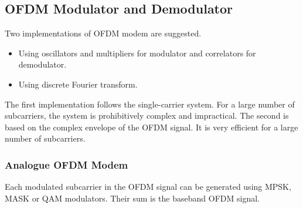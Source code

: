 \subsection{\gls{OFDM} Modulator and Demodulator}
Two implementations of \gls{OFDM} modem are suggested.
\begin{itemize}
	\item Using oscillators and multipliers for modulator and correlators for demodulator.
	\item Using discrete Fourier transform.
\end{itemize}
The first implementation follows the single-carrier system. For a large number of subcarriers, the system is prohibitively complex and impractical. The second is based on the complex envelope of the \gls{OFDM} signal. It is very efficient for a large number of subcarriers.

\subsubsection{Analogue \gls{OFDM} Modem}
Each modulated subcarrier in the \gls{OFDM} signal can be generated using \gls{MPSK}, \gls{MASK} or \gls{QAM} modulators. Their sum is the baseband \gls{OFDM} signal. 
